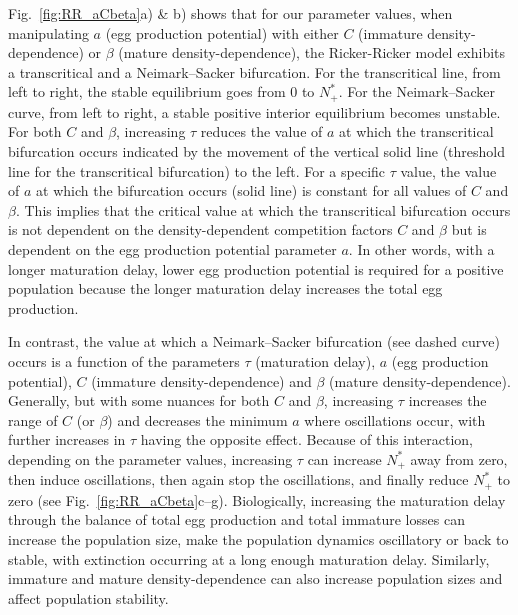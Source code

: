 \documentclass{article}
\numberwithin{theorem}{section}
\begin{document}
{Fig.~\ref{fig:RR_aCbeta}a) \& b) shows that for our parameter values, when manipulating $a$ (egg production potential) with either $C$ (immature density-dependence) or $\beta$ (mature density-dependence), the Ricker-Ricker model exhibits a transcritical and a Neimark--Sacker bifurcation. For the transcritical line, from left to right, the stable equilibrium goes from $0$ to $N^*_+$. For the Neimark--Sacker curve, from left to right, a stable positive interior equilibrium becomes unstable. For both $C$ and $\beta$, increasing $\tau$ reduces the value of $a$ at which the transcritical bifurcation occurs indicated by the movement of the vertical solid line (threshold line for the transcritical bifurcation) to the left. For a specific $\tau$ value, the value of $a$ at which the bifurcation occurs (solid line) is constant for all values of $C$ and $\beta$. This implies that the critical value at which the transcritical bifurcation occurs is not dependent on the density-dependent competition factors $C$ and $\beta$ but is dependent on the egg production potential parameter $a$. In other words, with a longer maturation delay, lower egg production potential is required for a positive population because the longer maturation delay increases the total egg production.

In contrast, the value at which a Neimark--Sacker bifurcation (see dashed curve) occurs is a function of the parameters $\tau$ (maturation delay), $a$ (egg production potential), $C$ (immature density-dependence) and $\beta$ (mature density-dependence). Generally, but with some nuances for both $C$ and $\beta$, increasing $\tau$ increases the range of $C$ (or $\beta$) and decreases the minimum $a$ where oscillations occur, with further increases in $\tau$ having the opposite effect. Because of this interaction, depending on the parameter values, increasing $\tau$ can increase $N^*_+$ away from zero, then induce oscillations, then again stop the oscillations, and finally reduce $N^*_+$ to zero (see Fig.~\ref{fig:RR_aCbeta}c--g). Biologically, increasing the maturation delay through the balance of total egg production and total immature losses can increase the population size, make the population dynamics oscillatory or back to stable, with extinction occurring at a long enough maturation delay.  Similarly, immature and mature density-dependence can also increase population sizes and affect population stability.

}
\end{document}
